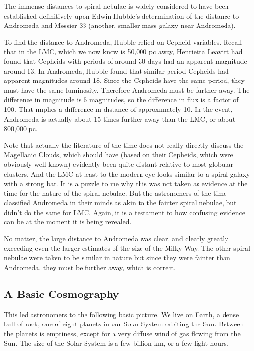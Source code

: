 \documentclass[12pt, preprint]{aastex}
\begin{document}
The immense distances to spiral nebulae is widely considered to have
been established definitively upon Edwin Hubble's determination of the
distance to Andromeda and Messier 33 (another, smaller mass galaxy
near Andromeda).

To find the distance to Andromeda, Hubble relied on Cepheid
variables. Recall that in the LMC, which we now know is 50,000 pc
away, Henrietta Leavitt had found that Cepheids with periods of around
30 days had an apparent magnitude around 13. In Andromeda, Hubble
found that similar period Cepheids had apparent magnitudes around
18. Since the Cepheids have the same period, they must have the same
luminosity. Therefore Andromeda must be further away. The difference
in magnitude is 5 magnitudes, so the difference in flux is a factor of
100. That implies a difference in distance of approximately 10. In the
event, Andromeda is actually about 15 times further away than the LMC,
or about 800,000 pc.

Note that actually the literature of the time does not really directly
discuss the Magellanic Clouds, which should have (based on their
Cepheids, which were obviously well known) evidently been quite
distant relative to most globular clusters. And the LMC at least to
the modern eye looks similar to a spiral galaxy with a strong bar. It
is a puzzle to me why this was not taken as evidence at the time for
the nature of the spiral nebulae. But the astronomers of the time
classified Andromeda in their minds as akin to the fainter spiral
nebulae, but didn't do the same for LMC. Again, it is a testament to
how confusing evidence can be at the moment it is being revealed.

No matter, the large distance to Andromeda was clear, and clearly
greatly exceeding even the larger estimates of the size of the Milky
Way. The other spiral nebulae were taken to be similar in nature but
since they were fainter than Andromeda, they must be further away,
which is correct.

\subsection{A Basic Cosmography}

This led astronomers to the following basic picture. We live on Earth,
a dense ball of rock, one of eight planets in our Solar System
orbiting the Sun. Between the planets is emptiness, except for a very
diffuse wind of gas flowing from the Sun. The size of the Solar System
is a few billion km, or a few light hours.
\end{document}
